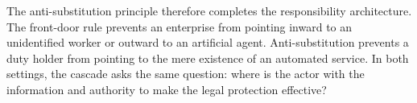 The anti-substitution principle therefore completes the responsibility architecture. The front-door rule prevents an enterprise from pointing inward to an unidentified worker or outward to an artificial agent. Anti-substitution prevents a duty holder from pointing to the mere existence of an automated service. In both settings, the cascade asks the same question: where is the actor with the information and authority to make the legal protection effective?
